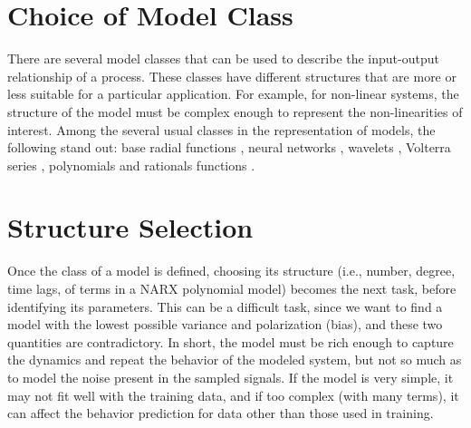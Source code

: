 \section{Choice of Model Class} \label{sec:choose model}

There are several model classes that can be used to describe the input-output relationship of a process. These classes have different structures that are more or less suitable for a particular application. For example, for non-linear systems, the structure of the model must be complex enough to represent the non-linearities of interest. Among the several usual classes in the representation of models, the following stand out: base radial functions \citep{broomhead1988}, neural networks \citep{haykin1994}, wavelets \citep{strang1989}, Volterra series \citep{billings1980}, polynomials and rationals functions \citep{billings1989}.

\section{Structure Selection}\label{sec:estr_selection}

Once the class of a model is defined, choosing its structure (i.e., number, degree, time lags, of terms in a NARX polynomial model) becomes the next task, before identifying its parameters.
This can be a difficult task, since we want to find a model with the lowest possible variance and polarization (bias), and these two quantities are contradictory.
In short, the model must be rich enough to capture the dynamics and repeat the behavior of the modeled system, but not so much as to model the noise present in the sampled signals.
If the model is very simple, it may not fit well with the training data, and if too complex (with many terms), it can affect the behavior prediction for data other than those used in training.

